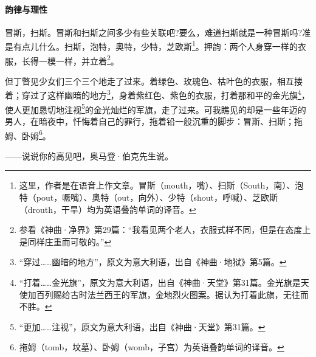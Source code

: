 \paragraph*{韵律与理性}
\par 冒斯，扫斯。冒斯和扫斯之间多少有些关联吧?要么，难道扫斯就是一种冒斯吗?准是有点儿什么。扫斯，泡特，奥特，少特，芝欧斯\footnote{这里，作者是在语音上作文章。冒斯（mouth，嘴）、扫斯（South，南）、泡特（pout，噘嘴）、奥特（out，向外）、少特（shout，呼喊）、芝欧斯（drouth，干旱）均为英语叠韵单词的译音。}。押韵：两个人身穿一样的衣服，长得一模一样，并立着\footnote{参看《神曲·净界》第29篇：“我看见两个老人，衣服式样不同，但是在态度上是同样庄重而可敬的。”}。
\par 但丁瞥见少女们三个三个地走了过来。着绿色、玫瑰色、枯叶色的衣服，相互搂着；穿过了这样幽暗的地方\footnote{“穿过……幽暗的地方”，原文为意大利语，出自《神曲·地狱》第5篇。}，身着紫红色、紫色的衣服，打着那和平的金光旗\footnote{“打着……金光旗”，原文为意大利语，出自《神曲·天堂》第31篇。金光旗是天使加百列赐给古时法兰西王的军旗，金地烈火图案。据认为打着此旗，无往而不胜。}，使人更加恳切地注视\footnote{“更加……注视”，原文为意大利语，出自《神曲·天堂》第31篇。}的金光灿烂的军旗，走了过来。可我瞧见的却是一些年迈的男人，在暗夜中，忏悔着自己的罪行，拖着铅一般沉重的脚步：冒斯、扫斯；拖姆、卧姆\footnote{拖姆（tomb，坟墓）、卧姆（womb，子宫）为英语叠韵单词的译音。}。
\par ——说说你的高见吧，奥马登·伯克先生说。
